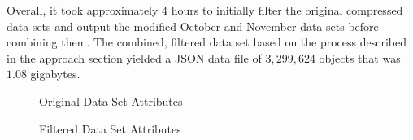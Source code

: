 \documentclass[letterpaper]{article}
\begin{document}
Overall, it took approximately $4$ hours to initially filter the original compressed data sets and output the modified October and November data sets before combining them. The combined, filtered data set based on the process described in the approach section yielded a JSON data file of $3,299,624$ objects that was $1.08$ gigabytes.

\begin{figure}[htbp]
\begin{minipage}[t]{0.45\linewidth}
    \caption{Original Data Set Attributes}
    \label{f1}
\end{minipage}%
    \hfill%
\begin{minipage}[t]{0.45\linewidth}
    \caption{Filtered Data Set Attributes}
    \label{f2}
\end{minipage} 
\end{figure}
\end{document}
